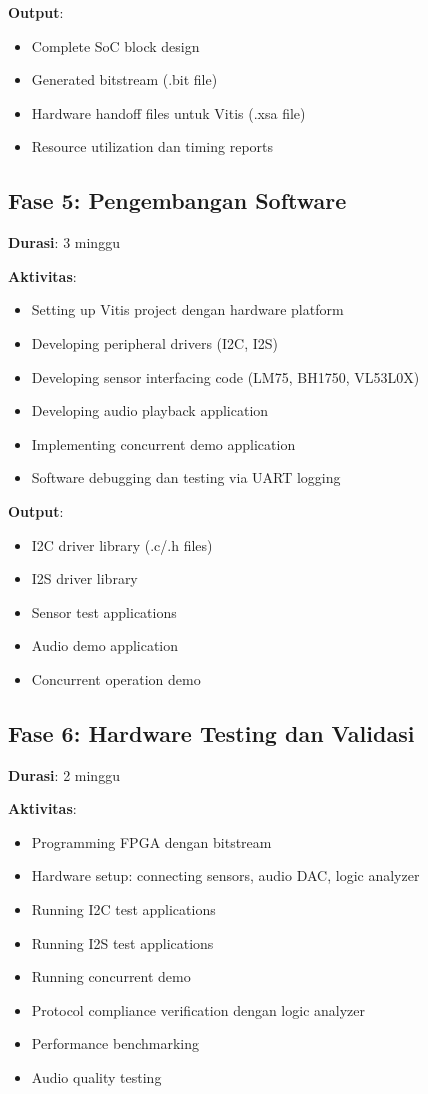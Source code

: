 \textbf{Output}:
\begin{itemize}
	\item Complete SoC block design
	\item Generated bitstream (.bit file)
	\item Hardware handoff files untuk Vitis (.xsa file)
	\item Resource utilization dan timing reports
\end{itemize}

\subsection{Fase 5: Pengembangan Software}

\textbf{Durasi}: 3 minggu

\textbf{Aktivitas}:
\begin{itemize}
	\item Setting up Vitis project dengan hardware platform
	\item Developing peripheral drivers (I2C, I2S)
	\item Developing sensor interfacing code (LM75, BH1750, VL53L0X)
	\item Developing audio playback application
	\item Implementing concurrent demo application
	\item Software debugging dan testing via UART logging
\end{itemize}

\textbf{Output}:
\begin{itemize}
	\item I2C driver library (.c/.h files)
	\item I2S driver library
	\item Sensor test applications
	\item Audio demo application
	\item Concurrent operation demo
\end{itemize}

\subsection{Fase 6: Hardware Testing dan Validasi}

\textbf{Durasi}: 2 minggu

\textbf{Aktivitas}:
\begin{itemize}
	\item Programming FPGA dengan bitstream
	\item Hardware setup: connecting sensors, audio DAC, logic analyzer
	\item Running I2C test applications
	\item Running I2S test applications
	\item Running concurrent demo
	\item Protocol compliance verification dengan logic analyzer
	\item Performance benchmarking
	\item Audio quality testing
\end{itemize}

